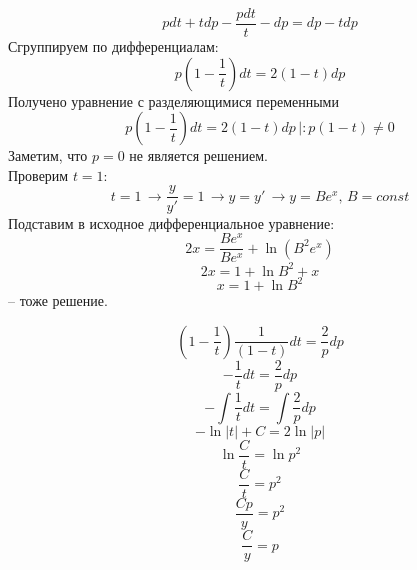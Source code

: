 \documentclass[a5paper, 10pt]{article}
\theoremstyle{definition}
\theoremstyle{plain}
\theoremstyle{remark}
\begin{document}
\begin{equation*}
 pdt + tdp - \frac{ pdt}{t}  - dp = dp  - t dp
\end{equation*}
Сгруппируем по дифференциалам:
\begin{equation*}
 p \left(1  - \frac{ 1}{t} \right) dt  = 2 (1  - t) dp
\end{equation*}
Получено уравнение с разделяющимися переменными
\begin{equation*}
 p \left(1  - \frac{ 1}{t} \right) dt  = 2 (1  - t) dp \, \left| : p (1  - t) \neq 0 \right.
\end{equation*}
Заметим, что $p = 0$ не является решением.\\
Проверим $t = 1$:
\begin{equation*}
 t = 1 \, \to  \frac{y}{y'} = 1 \, \to y = y' \, \to y = B e^x, \, B = const
\end{equation*}
Подставим в исходное дифференциальное уравнение:
\begin{equation*}
2x = \frac{ B e^x}{ B e^x} + \ln ( B^2 e^x)
\end{equation*}
\begin{equation*}
2x = 1 + \ln B^2 + x
\end{equation*}
\begin{equation*}
x = 1 + \ln B^2
\end{equation*}
-- тоже решение.





\begin{equation*}
  \left(1  - \frac{ 1}{t} \right) \frac{1}{ (1  - t) } dt  =  \frac{2}{p} dp 
\end{equation*}
\begin{equation*}
 - \frac{1}{ t } dt  =  \frac{2}{p} dp 
\end{equation*}
\begin{equation*}
 - \int \frac{1}{ t } dt  = \int \frac{2}{p} dp 
\end{equation*}
\begin{equation*}
 - \ln | t| + C  = 2 \ln| p|
\end{equation*}
\begin{equation*}
 \ln \frac{C}{t}  =  \ln p^2
\end{equation*}
\begin{equation*}
  \frac{C}{t}  =   p^2
\end{equation*}
\begin{equation*}
  \frac{Cp}{y}  =   p^2
\end{equation*}
\begin{equation*}
  \frac{C}{y}  =   p
\end{equation*}
\end{document}
